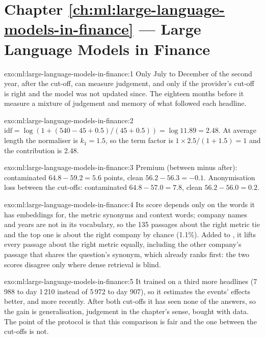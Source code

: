 \section*{Chapter \ref{ch:ml:large-language-models-in-finance} --- Large Language Models in Finance}

\begin{solution}{exo:ml:large-language-models-in-finance:1}
Only July to December of the second year, after the cut-off, can measure judgement, and only if the provider's cut-off is
right and the model was not updated since. The eighteen months before it measure a mixture of judgement and memory of what
followed each headline.
\end{solution}

\begin{solution}{exo:ml:large-language-models-in-finance:2}
$\text{idf} = \log(1 + (540 - 45 + 0.5)/(45 + 0.5)) = \log 11.89 = 2.48$. At average length the normaliser is $k_1 = 1.5$, so
the term factor is $1\times2.5/(1 + 1.5) = 1$ and the contribution is 2.48.
\end{solution}

\begin{solution}{exo:ml:large-language-models-in-finance:3}
Premium (between minus after): contaminated $64.8 - 59.2 = 5.6$ points, clean $56.2 - 56.3 = -0.1$. Anonymisation loss
between the cut-offs: contaminated $64.8 - 57.0 = 7.8$, clean $56.2 - 56.0 = 0.2$.
\end{solution}

\begin{solution}{exo:ml:large-language-models-in-finance:4}
Its score depends only on the words it has embeddings for, the metric synonyms and context words; company names and years
are not in its vocabulary, so the 135 passages about the right metric tie and the top one is about the right company by
chance (1.1\%). Added to , it lifts every passage about the right metric equally, including the other company's passage
that shares the question's synonym, which  already ranks first: the two scores disagree only where dense retrieval is
blind.
\end{solution}

\begin{solution}{exo:ml:large-language-models-in-finance:5}
It trained on a third more headlines (7\,988 to day 1\,210 instead of 5\,972 to day 907), so it estimates the events' effects better, and more
recently. After both cut-offs it has seen none of the answers, so the gain is generalisation, judgement in the chapter's
sense, bought with data. The point of the protocol is that this comparison is fair and the one between the cut-offs is not.
\end{solution}

